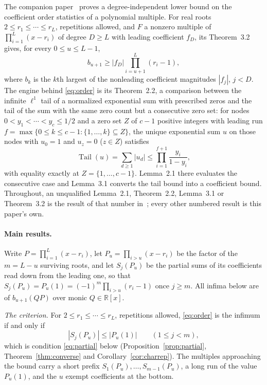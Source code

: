 \documentclass[11pt]{article}
\theoremstyle{definition}
\theoremstyle{plain}
\newcommand{\R}{\mathbb R}
\DeclareMathOperator{\Tail}{Tail}
\begin{document}
The companion paper~\cite{coefficient-mass} proves a degree-independent
lower bound on the coefficient order statistics of a polynomial multiple.
For real roots $2\le r_1\le\cdots\le r_L$, repetitions allowed, and $F$ a
nonzero multiple of $\prod_{i=1}^L(x-r_i)$ of degree $D\ge L$ with leading
coefficient $f_D$, its Theorem~3.2 gives, for every $0\le u\le L-1$,
\begin{equation}\label{eq:order}
  b_{u+1}\ge|f_D|\prod_{i=u+1}^L(r_i-1),
\end{equation}
where $b_k$ is the $k$th largest of the nonleading coefficient magnitudes
$|f_j|$, $j<D$.  The engine behind \eqref{eq:order} is its Theorem~2.2, a
comparison between the infinite $\ell^1$ tail of a normalized exponential
sum with prescribed zeros and the tail of the sum with the same zero count
but a consecutive zero set: for nodes $0<y_1<\cdots<y_c\le1/2$ and a zero
set $Z$ of $c-1$ positive integers with leading run
$f=\max\{0\le k\le c-1:\{1,\ldots,k\}\subseteq Z\}$, the unique exponential
sum $u$ on those nodes with $u_0=1$ and $u_z=0$ ($z\in Z$) satisfies
\[
  \Tail(u)=\sum_{d\ge1}|u_d|\le\prod_{i=1}^{f+1}\frac{y_i}{1-y_i},
\]
with equality exactly at $Z=\{1,\ldots,c-1\}$.  Lemma~2.1 there evaluates
the consecutive case and Lemma~3.1 converts the tail bound into a
coefficient bound.  Throughout, an unqualified Lemma~2.1, Theorem~2.2,
Lemma~3.1 or Theorem~3.2 is the result of that number
in~\cite{coefficient-mass}; every other numbered result is this paper's own.

\paragraph{Main results.}  Write $P=\prod_{i=1}^L(x-r_i)$, let
$P_u=\prod_{i>u}(x-r_i)$ be the factor of the $m=L-u$ surviving roots, and let
$S_j(P_u)$ be the partial sums of its coefficients read down from the leading
one, so that $S_j(P_u)=P_u(1)=(-1)^m\prod_{i>u}(r_i-1)$ once $j\ge m$.  All
infima below are of $b_{u+1}(QP)$ over monic $Q\in\R[x]$.

\emph{The criterion.}  For $2\le r_1\le\cdots\le r_L$, repetitions allowed,
\eqref{eq:order} is the infimum if and only if
\[
  |S_j(P_u)|\le|P_u(1)|\qquad(1\le j<m),
\]
which is condition \eqref{eq:partial} below (Proposition~\ref{prop:partial},
Theorem~\ref{thm:converse} and Corollary~\ref{cor:charrep}).  The multiples
approaching the bound carry a short prefix $S_1(P_u),\ldots,S_{m-1}(P_u)$, a
long run of the value $P_u(1)$, and the $u$ exempt coefficients at the
bottom.
\end{document}

